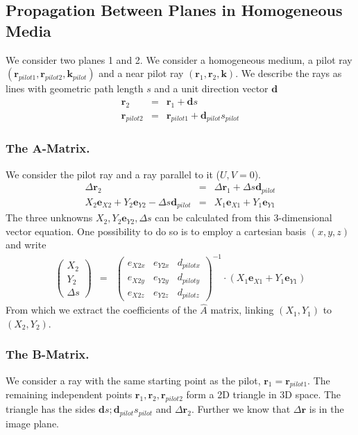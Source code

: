 \documentclass[12pt,a4paper,twoside,openright,BCOR10mm,headsepline,titlepage,abstracton,chapterprefix,final]{scrreprt}
\newcommand\Vector[1]{{\mathbf{#1}}}
\newcommand\wavenumber{k}
\newcommand\Wavevector{\Vector{\wavenumber}}
\begin{document}
\subsection{Propagation Between Planes in Homogeneous Media}
We consider two planes 1 and 2.
We consider a homogeneous medium, a pilot ray $( \Vector{r}_{pilot1}, \Vector{r}_{pilot2}, \Wavevector_{pilot} )$
and a near pilot ray $( \Vector{r}_{1}, \Vector{r}_{2}, \Wavevector )$. 
We describe the rays as lines with geometric path length $s$ and a unit direction vector $\Vector{d}$
\begin{eqnarray}
 \Vector{r}_{2} &=& \Vector{r}_{1} + \Vector{d} s  \\
 \Vector{r}_{pilot2} &=& \Vector{r}_{pilot1} + \Vector{d}_{pilot} s_{pilot}
\end{eqnarray}

\subsubsection{The A-Matrix.}
We consider the pilot ray and a ray parallel to it ($U,V=0$).
\begin{eqnarray}
 \Delta \Vector{r}_2 &=& \Delta \Vector{r}_1 + \Delta s \Vector{d}_{pilot} \\
 X_2 \Vector{e}_{X2} +  Y_2 \Vector{e}_{Y2} - \Delta s \Vector{d}_{pilot} &=&  X_1 \Vector{e}_{X1} +  Y_1 \Vector{e}_{Y1} 
\end{eqnarray}
The three unknowns $X_2 , Y_2 \Vector{e}_{Y2} , \Delta s$ can be calculated from this 3-dimensional vector equation.
One possibility to do so is to employ a cartesian basis $(x,y,z)$ and write
\begin{eqnarray}
 \begin{pmatrix}
  X_2 \\ Y_2 \\ \Delta s
 \end{pmatrix}
 &=&
 \begin{pmatrix}
  e_{X2x} & e_{Y2x} & d_{pilotx} \\
  e_{X2y} & e_{Y2y} & d_{piloty} \\
  e_{X2z} & e_{Y2z} & d_{pilotz}  
 \end{pmatrix}^{-1}
 \cdot
 \left(
 X_1 \Vector{e}_{X1} + Y_1 \Vector{e}_{Y1}
 \right)
\end{eqnarray}
From which we extract the coefficients of the $\hat{A}$ matrix, 
linking $(X_1,Y_1)$ to $(X_2,Y_2)$.

\subsubsection{The B-Matrix.}
We consider a ray with the same starting point as the pilot, $\Vector{r}_{1} = \Vector{r}_{pilot1}$. 
The remaining independent points $\Vector{r}_{1}, \Vector{r}_{2}, \Vector{r}_{pilot2}$ form a 2D triangle in 3D space.
The triangle has the sides $\Vector{d} s ; \Vector{d}_{pilot} s_{pilot}$ and $\Delta \Vector{r}_2$. 
Further we know that $\Delta \Vector{r}$ is in the image plane.
\end{document}
